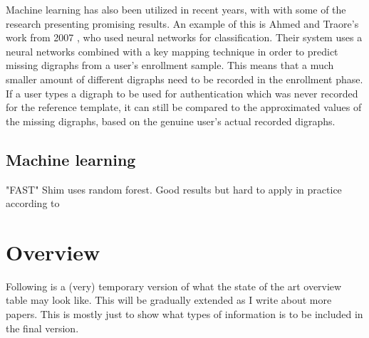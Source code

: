 \documentclass[informationsecurity]{gucmasterproject}
\begin{document}
Machine learning has also been utilized in recent years, with with some of the research presenting promising results.
An example of this is Ahmed and Traore's work from 2007 \cite{Ahmed}, who used neural networks for classification.
Their system uses a neural networks combined with a key mapping technique in order to predict missing digraphs from a user's enrollment sample.
This means that a much smaller amount of different digraphs need to be recorded in the enrollment phase.
If a user types a digraph to be used for authentication which was never recorded for the reference template, it can still be compared to the approximated values of the missing digraphs, based on the genuine user's actual recorded digraphs.


\subsection{Machine learning}
"FAST" Shim uses random forest. Good results but hard to apply in practice according to \cite{KANG201572}

\section{Overview}

Following is a (very) temporary version of what the state of the art overview table may look like.
This will be gradually extended as I write about more papers.
This is mostly just to show what types of information is to be included in the final version.
% 
\end{document}
